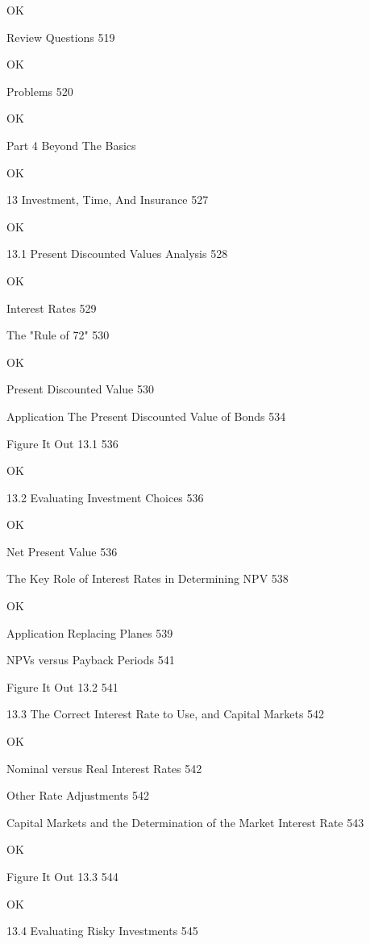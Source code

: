 OK

Review Questions 519

OK

Problems 520

OK

Part 4 Beyond The Basics

OK

13 Investment, Time, And Insurance 527

OK

13.1 Present Discounted Values Analysis 528

OK

Interest Rates 529



The "Rule of 72" 530

OK

Present Discounted Value 530



Application The Present Discounted Value of Bonds 534



Figure It Out 13.1 536

OK

13.2 Evaluating Investment Choices 536

OK

Net Present Value 536



The Key Role of Interest Rates in Determining NPV 538

OK

Application Replacing Planes 539



NPVs versus Payback Periods 541



Figure It Out 13.2 541



13.3 The Correct Interest Rate to Use, and Capital Markets 542

OK

Nominal versus Real Interest Rates 542



Other Rate Adjustments 542



Capital Markets and the Determination of the Market Interest Rate 543

OK

Figure It Out 13.3 544

OK

13.4 Evaluating Risky Investments 545



